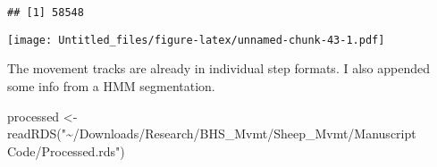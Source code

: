 \documentclass[
]{article}
\newenvironment{Shaded}{\begin{snugshade}}{\end{snugshade}}
\newcommand{\FunctionTok}[1]{\textcolor[rgb]{0.00,0.00,0.00}{#1}}
\newcommand{\NormalTok}[1]{#1}
\newcommand{\OtherTok}[1]{\textcolor[rgb]{0.56,0.35,0.01}{#1}}
\newcommand{\SpecialCharTok}[1]{\textcolor[rgb]{0.00,0.00,0.00}{#1}}
\newcommand{\StringTok}[1]{\textcolor[rgb]{0.31,0.60,0.02}{#1}}
\begin{document}
\begin{verbatim}
## [1] 58548
\end{verbatim}

\begin{Shaded}
\end{Shaded}

\texttt{[image: Untitled\_files/figure-latex/unnamed-chunk-43-1.pdf]}

The movement tracks are already in individual step formats. I also
appended some info from a HMM segmentation.

\begin{Shaded}
\begin{Highlighting}[]
\NormalTok{processed }\OtherTok{\textless{}{-}} \FunctionTok{readRDS}\NormalTok{(}\StringTok{"\textasciitilde{}/Downloads/Research/BHS\_Mvmt/Sheep\_Mvmt/Manuscript Code/Processed.rds"}\NormalTok{)}


\end{Highlighting}
\end{Shaded}
\end{document}
